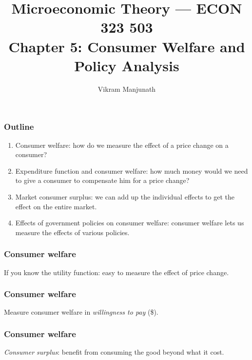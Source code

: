 \documentclass[xcolor=pdftex,dvipsnames]{beamer}
\title{Microeconomic Theory --- ECON 323 503 \\ Chapter 5: Consumer
  Welfare and Policy Analysis}
\author{Vikram Manjunath}
\institute{Texas A\&M University}
\begin{document}
\maketitle

\begin{frame}
\frametitle{Outline}
\begin{enumerate}[<+->]
\item Consumer welfare: how do we measure the effect of a price change
  on a consumer?
\item Expenditure function and consumer welfare: how much money would
  we need to give a consumer to compensate him for a price change?
\item Market consumer surplus: we can add up the individual effects to
  get the effect on the entire market.
\item Effects of government policies on consumer welfare: consumer
  welfare lets us measure the effects of various policies.
\end{enumerate}
\end{frame}

\begin{frame}
\frametitle{Consumer welfare}
If you know the utility function: easy to measure the effect of price
change.
\bigskip

\bigskip
{}

\bigskip
{}
\bigskip

\end{frame}




\begin{frame}
\frametitle{Consumer welfare}
Measure consumer welfare in \emph{willingness to pay} (\$).

\bigskip
{}

\end{frame}




\begin{frame}
\frametitle{Consumer welfare}
\emph{Consumer surplus}: benefit from consuming the good beyond what
it cost.

\bigskip
{}

\bigskip
{}


\end{frame}
\end{document}
